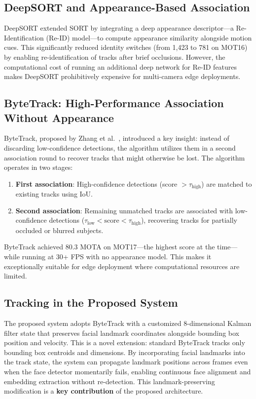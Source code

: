 \documentclass[12pt, a4paper]{article}
\begin{document}
\subsection{DeepSORT and Appearance-Based Association}

DeepSORT \cite{wojke2017} extended SORT by integrating a deep appearance descriptor---a Re-Identification (Re-ID) model---to compute appearance similarity alongside motion cues. This significantly reduced identity switches (from 1,423 to 781 on MOT16) by enabling re-identification of tracks after brief occlusions. However, the computational cost of running an additional deep network for Re-ID features makes DeepSORT prohibitively expensive for multi-camera edge deployments.

\subsection{ByteTrack: High-Performance Association Without Appearance}

ByteTrack, proposed by Zhang et al.\ \cite{zhang2022bytetrack}, introduced a key insight: instead of discarding low-confidence detections, the algorithm utilizes them in a second association round to recover tracks that might otherwise be lost. The algorithm operates in two stages:

\begin{enumerate}[label=\arabic*.]
    \item \textbf{First association}: High-confidence detections (score $> \tau_{\text{high}}$) are matched to existing tracks using IoU.
    \item \textbf{Second association}: Remaining unmatched tracks are associated with low-confidence detections ($\tau_{\text{low}} < \text{score} < \tau_{\text{high}}$), recovering tracks for partially occluded or blurred subjects.
\end{enumerate}

\noindent ByteTrack achieved 80.3 MOTA on MOT17---the highest score at the time---while running at 30+ FPS with no appearance model. This makes it exceptionally suitable for edge deployment where computational resources are limited.

\subsection{Tracking in the Proposed System}

The proposed system adopts ByteTrack with a customized 8-dimensional Kalman filter state that preserves facial landmark coordinates alongside bounding box position and velocity. This is a novel extension: standard ByteTrack tracks only bounding box centroids and dimensions. By incorporating facial landmarks into the track state, the system can propagate landmark positions across frames even when the face detector momentarily fails, enabling continuous face alignment and embedding extraction without re-detection. This landmark-preserving modification is a \textbf{key contribution} of the proposed architecture.
\end{document}
